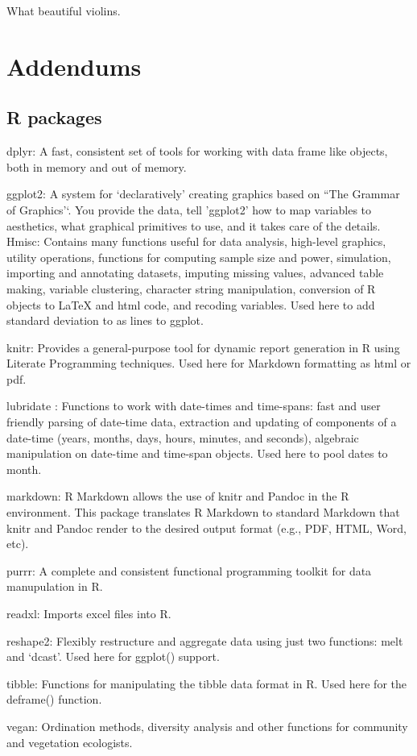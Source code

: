 \documentclass[
  11pt,
]{article}
\begin{document}
What beautiful violins.

\newpage

\hypertarget{addendums}{%
\section{Addendums}\label{addendums}}

\hypertarget{r-packages}{%
\subsection{R packages}\label{r-packages}}

dplyr: A fast, consistent set of tools for working with data frame like
objects, both in memory and out of memory.

ggplot2: A system for `declaratively' creating graphics based on ``The
Grammar of Graphics'`. You provide the data, tell 'ggplot2' how to map
variables to aesthetics, what graphical primitives to use, and it takes
care of the details. Hmisc: Contains many functions useful for data
analysis, high-level graphics, utility operations, functions for
computing sample size and power, simulation, importing and annotating
datasets, imputing missing values, advanced table making, variable
clustering, character string manipulation, conversion of R objects to
LaTeX and html code, and recoding variables. Used here to add standard
deviation to as lines to ggplot.

knitr: Provides a general-purpose tool for dynamic report generation in
R using Literate Programming techniques. Used here for Markdown
formatting as html or pdf.

lubridate : Functions to work with date-times and time-spans: fast and
user friendly parsing of date-time data, extraction and updating of
components of a date-time (years, months, days, hours, minutes, and
seconds), algebraic manipulation on date-time and time-span objects.
Used here to pool dates to month.

markdown: R Markdown allows the use of knitr and Pandoc in the R
environment. This package translates R Markdown to standard Markdown
that knitr and Pandoc render to the desired output format (e.g., PDF,
HTML, Word, etc).

purrr: A complete and consistent functional programming toolkit for data
manupulation in R.

readxl: Imports excel files into R.

reshape2: Flexibly restructure and aggregate data using just two
functions: melt and `dcast'. Used here for ggplot() support.

tibble: Functions for manipulating the tibble data format in R. Used
here for the deframe() function.

vegan: Ordination methods, diversity analysis and other functions for
community and vegetation ecologists.
\end{document}
